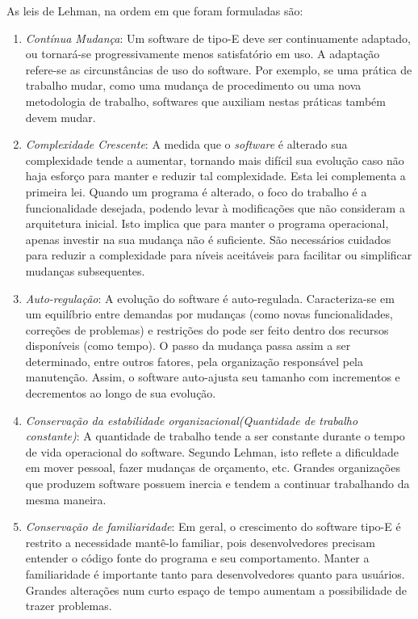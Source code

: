 As leis de Lehman, na ordem em que foram formuladas são:
\begin{enumerate}
	\item \textit{Contínua Mudança}: Um software de tipo-E deve ser continuamente adaptado, ou tornará-se progressivamente menos satisfatório em uso. A adaptação refere-se as circunstâncias de uso do software. Por exemplo, se uma prática de trabalho mudar, como uma mudança de procedimento ou uma nova metodologia de trabalho, softwares que auxiliam nestas práticas também devem mudar.
	\item \textit{Complexidade Crescente}: A medida que o \textit{software} é alterado sua complexidade tende a aumentar, tornando mais difícil sua evolução caso não haja esforço para manter e reduzir tal complexidade. Esta lei complementa a primeira lei. Quando um programa é alterado, o foco do trabalho é a funcionalidade desejada, podendo levar à modificações que não consideram a arquitetura inicial. Isto implica que para manter o programa operacional, apenas investir na sua mudança não é suficiente. São necessários cuidados para reduzir a complexidade para níveis aceitáveis para facilitar ou simplificar mudanças subsequentes.
	\item \textit{Auto-regulação}: A evolução do software é auto-regulada. Caracteriza-se em um equilíbrio entre demandas por mudanças (como novas funcionalidades, correções de problemas) e restrições do pode ser feito dentro dos recursos disponíveis (como tempo). O passo da mudança passa assim a ser determinado, entre outros fatores, pela organização responsável pela manutenção. Assim, o software auto-ajusta seu tamanho com incrementos e decrementos ao longo de sua evolução.
	\item \textit{Conservação da estabilidade organizacional(Quantidade de trabalho constante)}: A quantidade de trabalho tende a ser constante durante o tempo de vida operacional do software. Segundo Lehman, isto reflete a dificuldade em mover pessoal, fazer mudanças de orçamento, etc. Grandes organizações que produzem software possuem inercia e tendem a continuar trabalhando da mesma maneira. 
	\item \textit{Conservação de familiaridade}: Em geral, o crescimento do software tipo-E é restrito a necessidade mantê-lo familiar, pois desenvolvedores precisam entender o código fonte do programa e seu comportamento. Manter a familiaridade é importante tanto para desenvolvedores quanto para usuários. Grandes alterações num curto espaço de tempo aumentam a possibilidade de trazer problemas.

\end{enumerate}
